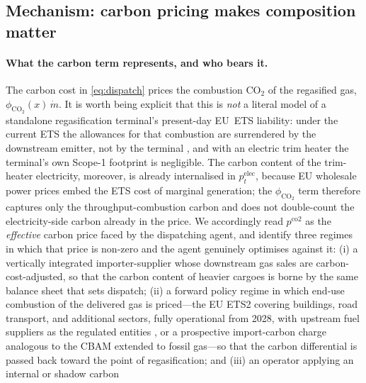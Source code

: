 \documentclass[11pt]{article}
\begin{document}
\subsection{Mechanism: carbon pricing makes composition matter}
\label{sec:mechanism}

\paragraph{What the carbon term represents, and who bears it.}
The carbon cost in \cref{eq:dispatch} prices the combustion CO$_2$ of the
regasified gas, $\phi_{\text{CO}_2}(x)\,\dot m$. It is worth being explicit
that this is \emph{not} a literal model of a standalone regasification
terminal's present-day EU~ETS liability: under the current ETS the allowances
for that combustion are surrendered by the downstream emitter, not by the
terminal \citep{eu2023ets}, and with an electric trim heater the terminal's own Scope-1 footprint
is negligible. The carbon content of the trim-heater electricity, moreover, is
already internalised in $p^{\text{elec}}_t$, because EU wholesale power prices
embed the ETS cost of marginal generation; the $\phi_{\text{CO}_2}$ term
therefore captures only the throughput-combustion carbon and does not
double-count the electricity-side carbon already in the price. We accordingly
read $p^{\text{co2}}$ as the \emph{effective} carbon price faced by the
dispatching agent, and identify three regimes in which that price is non-zero
and the agent genuinely optimises against it: (i) a vertically integrated
importer-supplier whose downstream gas sales are carbon-cost-adjusted, so that
the carbon content of heavier cargoes is borne by the same balance sheet that
sets dispatch; (ii) a forward policy regime in which end-use combustion of the
delivered gas is priced---the EU ETS2 covering buildings, road transport, and
additional sectors, fully operational from 2028, with upstream fuel suppliers
as the regulated entities \citep{eu_ets2_commission_2026}, or a prospective
import-carbon charge analogous to the CBAM extended
to fossil gas---so that the carbon differential is passed back toward the point
of regasification; and (iii) an operator applying an internal or shadow carbon
\end{document}

